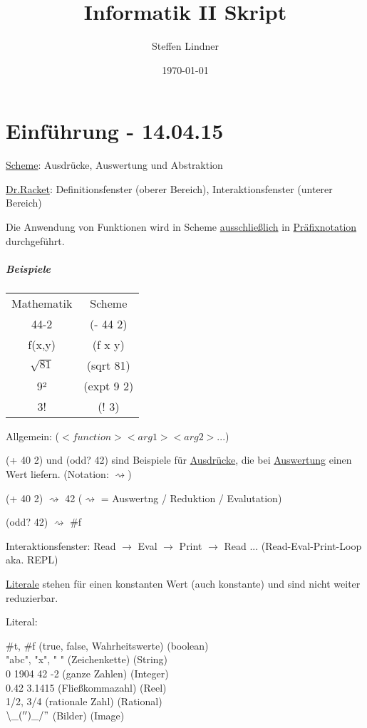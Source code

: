 \documentclass[a4paper, 20pt, openany]{book}
\author{Steffen Lindner}
\title{\vspace{-2cm}Informatik II Skript}
\date{\today{}}
\begin{document}
\maketitle
\tableofcontents

\chapter{Einführung - 14.04.15}\uline{Scheme}: Ausdrücke, Auswertung und Abstraktion 

\uline{Dr.Racket}: Definitionsfenster (oberer Bereich), Interaktionsfenster (unterer Bereich) 

Die Anwendung von Funktionen wird in Scheme \uline{ausschließlich} in \uline{Präfixnotation} durchgeführt.

\paragraph{Beispiele}
\begin{flushleft}
	\begin{tabular}{c|c}
		Mathematik & Scheme \\
		44-2 & (- 44 2) \\
		f(x,y) & (f x y) \\
		$\sqrt{81}$& (sqrt 81) \\
		9² & (expt 9 2) \\
		3! & (! 3)  {}
	\end{tabular}
\end{flushleft}

Allgemein: ($<function> <arg1> <arg2> ...$)

(+ 40 2) und (odd? 42) sind Beispiele für \uline{Ausdrücke}, die bei \uline{Auswertung} einen Wert liefern. (Notation: $\rightsquigarrow$)

(+ 40 2) $\rightsquigarrow$ 42 ($\rightsquigarrow$ = Auswertng / Reduktion / Evalutation)

(odd? 42) $\rightsquigarrow$ \#f

Interaktionsfenster: Read $\rightarrow$ Eval $\rightarrow$ Print $\rightarrow$ Read ... (Read-Eval-Print-Loop aka. REPL)

\uline{Literale} stehen für einen konstanten Wert (auch konstante) und sind nicht weiter reduzierbar.

Literal: 

\#t, \#f (true, false, Wahrheitswerte) (boolean) \\
"abc", "x", " " (Zeichenkette) (String) \\
0 1904 42 -2 (ganze Zahlen) (Integer) \\
0.42 3.1415 (Fließkommazahl) (Reel) \\
1/2, 3/4 (rationale Zahl) (Rational) \\
$\backslash\_('')\_/"$ (Bilder) (Image)
\end{document}
